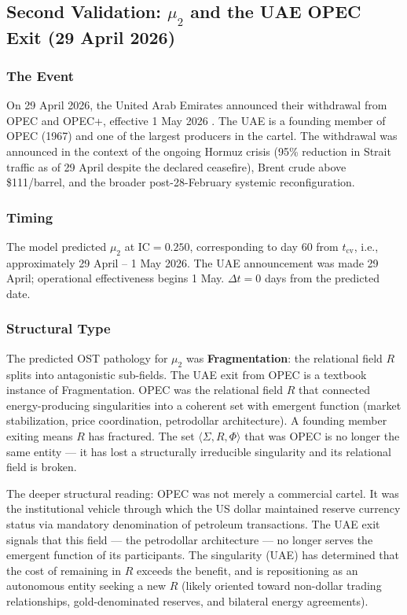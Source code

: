 \documentclass[12pt,a4paper]{article}
\newcommand{\IC}{\mathrm{IC}}
\begin{document}
\subsection{Second Validation: $\mu_2$ and the UAE OPEC Exit (29 April 2026)}\label{subsec:mu2_validation}

\subsubsection{The Event}

On 29 April 2026, the United Arab Emirates announced their withdrawal from OPEC and OPEC+, effective 1 May 2026 \cite{uae_opec_exit}. The UAE is a founding member of OPEC (1967) and one of the largest producers in the cartel. The withdrawal was announced in the context of the ongoing Hormuz crisis (95\% reduction in Strait traffic as of 29 April despite the declared ceasefire), Brent crude above \$111/barrel, and the broader post-28-February systemic reconfiguration.

\subsubsection{Timing}

The model predicted $\mu_2$ at $\IC = 0.250$, corresponding to day 60 from $t_{\mathrm{cv}}$, i.e., approximately 29 April -- 1 May 2026. The UAE announcement was made 29 April; operational effectiveness begins 1 May. $\Delta t = 0$ days from the predicted date.

\subsubsection{Structural Type}

The predicted OST pathology for $\mu_2$ was \textbf{Fragmentation}: the relational field $R$ splits into antagonistic sub-fields. The UAE exit from OPEC is a textbook instance of Fragmentation. OPEC was the relational field $R$ that connected energy-producing singularities into a coherent set with emergent function (market stabilization, price coordination, petrodollar architecture). A founding member exiting means $R$ has fractured. The set $\langle \Sigma, R, \Phi \rangle$ that was OPEC is no longer the same entity --- it has lost a structurally irreducible singularity and its relational field is broken.

The deeper structural reading: OPEC was not merely a commercial cartel. It was the institutional vehicle through which the US dollar maintained reserve currency status via mandatory denomination of petroleum transactions. The UAE exit signals that this field --- the petrodollar architecture --- no longer serves the emergent function of its participants. The singularity (UAE) has determined that the cost of remaining in $R$ exceeds the benefit, and is repositioning as an autonomous entity seeking a new $R$ (likely oriented toward non-dollar trading relationships, gold-denominated reserves, and bilateral energy agreements).
\end{document}
